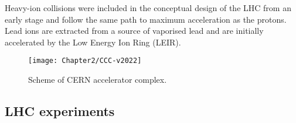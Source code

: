Heavy-ion collisions were included in the conceptual design of the LHC from an early stage and 
follow the same path to maximum acceleration as the protons. Lead ions are extracted from a source 
of vaporised lead and are initially accelerated by the Low Energy Ion Ring (LEIR). 

	
	\begin{figure}
 	  \centering
 	  \texttt{[image: Chapter2/CCC-v2022]}
	  \caption{Scheme of CERN accelerator complex.}
	  \label{fig:Chap2:LHC_AcceleratorComplex}
	\end{figure}

\subsection{LHC experiments}


